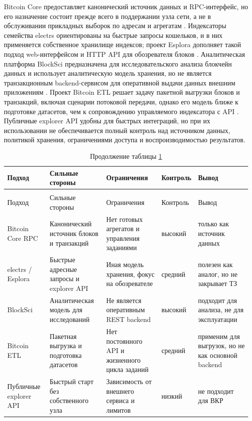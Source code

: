 Bitcoin Core предоставляет канонический источник данных и RPC-интерфейс, но
его назначение состоит прежде всего в поддержании узла сети, а не в
обслуживании прикладных выборок по адресам и агрегатам \cite{btc_core_rpc}.
Индексаторы семейства electrs ориентированы на быстрые запросы кошельков, и
в них применяется собственное хранилище индексов; проект Esplora дополняет такой
подход web-интерфейсом и HTTP API для обозревателя блоков
\cite{electrs_repo, esplora_repo}. Аналитическая платформа BlockSci
предназначена для исследовательского анализа блокчейн данных и использует
аналитическую модель хранения, но не является транзакционным backend-сервисом
для оперативной выдачи данных внешним приложениям \cite{blocksci_paper}.
Проект Bitcoin ETL решает задачу пакетной выгрузки блоков и транзакций,
включая сценарии потоковой передачи, однако его модель ближе к подготовке
датасетов, чем к сопровождению управляемого индексатора с API
\cite{bitcoin_etl_repo}. Публичные explorer API удобны для быстрых интеграций,
но при их использовании не обеспечивается полный контроль над источником данных, политикой хранения,
ограничениями доступа и воспроизводимостью результатов.

\begin{footnotesize}
\setlength{\tabcolsep}{3pt}
\begin{longtable}{|p{}|p{}|p{}|p{}|p{}|}
    \caption{Сравнение подходов к получению и индексации данных Bitcoin}\label{tab:indexer-approaches}\\ \hline
    Подход & Сильные стороны & Ограничения & Контроль & Вывод \\ \hline
    \endfirsthead
    \caption*{Продолжение таблицы \ref{tab:indexer-approaches}}\\ \hline
    Подход & Сильные стороны & Ограничения & Контроль & Вывод \\ \hline
    \endhead
    \hline
    \endfoot
    \hline
    \endlastfoot
    Bitcoin Core RPC &
    Канонический источник блоков и транзакций &
    Нет готовых агрегатов и управления заданиями &
    высокий &
    только как источник данных \\ \hline
    electrs / Esplora &
    Быстрые адресные запросы и explorer API &
    Иная модель хранения, фокус на обозревателе &
    средний &
    полезен как аналог, но не закрывает ТЗ \\ \hline
    BlockSci &
    Аналитическая модель для исследований &
    Не является оперативным REST backend &
    высокий &
    подходит для анализа, не для эксплуатации \\ \hline
    Bitcoin ETL &
    Пакетная выгрузка и подготовка датасетов &
    Нет постоянного API и жизненного цикла заданий &
    средний &
    применим для выгрузок, но не как основной backend \\ \hline
    Публичные explorer API &
    Быстрый старт без собственного узла &
    Зависимость от внешнего сервиса и лимитов &
    низкий &
    не подходит для ВКР \\ \hline
\end{longtable}
\end{footnotesize}

